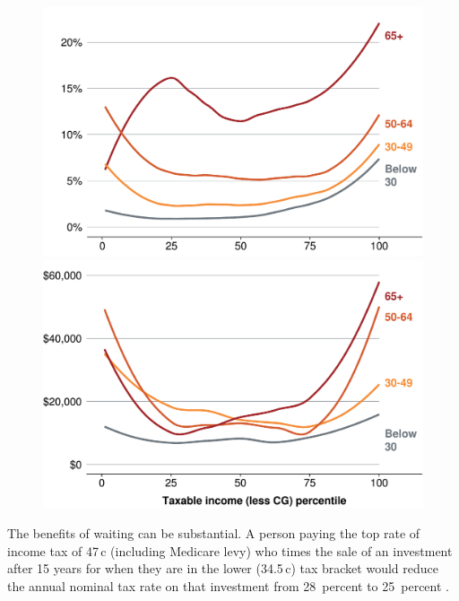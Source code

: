 \documentclass{grattan}\usepackage[]{graphicx}\usepackage[]{color}
\begin{document}
\begin{figure}
\includegraphics[width=\columnwidth]{CGT-NG-atlas//CGT-by-age-income-1}
\includegraphics[width=\columnwidth]{CGT-NG-atlas//CGT-by-age-income-weight-CG-1}
\end{figure}






The benefits of waiting can be substantial. A person paying the top rate of income tax of 47\,c (including Medicare levy) who times the sale of an investment after 15 years for when they are in the lower (34.5\,c) tax bracket would reduce the annual nominal tax rate on that investment from 28~percent to 25~percent .
\end{document}
